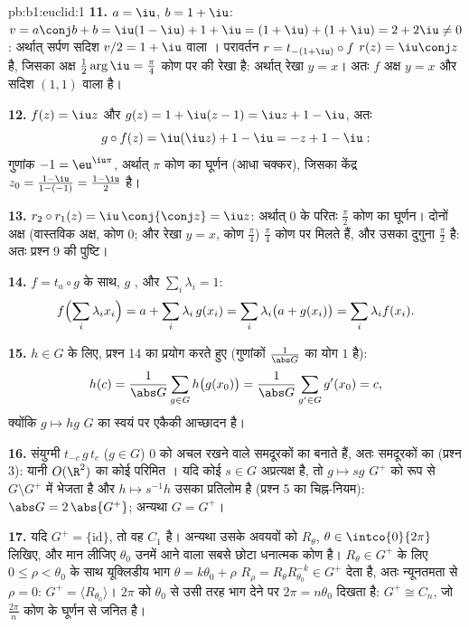 \begin{solution}{pb:b1:euclid:1}
\textbf{11.} $a = \iu$, $b = 1 + \iu$: $v = a\conj b + b = \iu(1 - \iu) + 1
+ \iu = (1 + \iu) + (1 + \iu) = 2 + 2\iu \neq 0$: अर्थात् सर्पण सदिश $v/2 =
1 + \iu$ वाला । परावर्तन $r = t_{-(1+\iu)}\circ f$ $r(z) =
\iu\conj z$ है, जिसका अक्ष $\frac12\arg\iu = \frac\pi4$ कोण पर की रेखा है:
अर्थात् रेखा $y = x$। अतः $f$ अक्ष $y = x$ और सदिश $(1, 1)$ वाला  है।

\textbf{12.} $f(z) = \iu z$ और $g(z) = 1 + \iu(z - 1) = \iu z + 1 - \iu$,
अतः
\[
g\circ f(z) = \iu(\iu z) + 1 - \iu = -z + 1 - \iu :
\]
 गुणांक $-1 = \eu^{\iu\pi}$, अर्थात् $\pi$ कोण का घूर्णन (आधा चक्कर),
जिसका केंद्र $z_0 = \frac{1 - \iu}{1 - (-1)} = \frac{1 - \iu}{2}$ है।

\textbf{13.} $r_2\circ r_1(z) = \iu\,\conj{\conj z} = \iu z$: अर्थात् $0$ के
परितः $\frac\pi2$ कोण का घूर्णन। दोनों अक्ष (वास्तविक अक्ष, कोण $0$; और रेखा
$y = x$, कोण $\frac\pi4$) $\frac\pi4$ कोण पर मिलते हैं, और उसका दुगुना
$\frac\pi2$ है: अतः प्रश्न 9 की पुष्टि।

\textbf{14.} $f = t_a\circ g$ के साथ, $g$ , और $\sum_i \lambda_i = 1$:
\[
f\Bigl(\sum_i \lambda_i x_i\Bigr)
= a + \sum_i \lambda_i\,g(x_i)
= \sum_i \lambda_i\bigl(a + g(x_i)\bigr)
= \sum_i \lambda_i f(x_i) .
\]

\textbf{15.} $h \in G$ के लिए, प्रश्न 14 का प्रयोग करते हुए (गुणांकों
$\frac1{\abs G}$ का योग $1$ है):
\[
h(c) = \frac{1}{\abs G}\sum_{g \in G} h\bigl(g(x_0)\bigr)
= \frac{1}{\abs G}\sum_{g' \in G} g'(x_0) = c ,
\]
क्योंकि $g \mapsto hg$ $G$ का स्वयं पर एकैकी आच्छादन है।

\textbf{16.} संयुग्मी $t_{-c}\,g\,t_{c}$ ($g \in G$) $0$ को अचल रखने वाले
समदूरकों का  बनाते हैं, अतः \emph{} समदूरकों का (प्रश्न 3): यानी
$O(\R^2)$ का कोई परिमित । यदि कोई $s \in G$ अप्रत्यक्ष है, तो
 $g \mapsto sg$ $G^+$ को  रूप से $G\setminus G^+$ में भेजता
है और $h \mapsto s^{-1}h$ उसका प्रतिलोम है (प्रश्न 5 का चिह्न-नियम): $\abs G
= 2\,\abs{G^+}$; अन्यथा $G = G^+$।

\textbf{17.} यदि $G^{+} = \{\mathrm{id}\}$, तो वह $C_1$ है। अन्यथा उसके
अवयवों को $R_\theta$, $\theta \in \intco{0}{2\pi}$ लिखिए, और मान लीजिए
$\theta_0$ उनमें आने वाला सबसे छोटा धनात्मक कोण है। $R_\theta \in G^{+}$ के
लिए $0 \leq \rho < \theta_0$ के साथ यूक्लिडीय भाग $\theta = k\theta_0 +
\rho$ $R_\rho = R_\theta R_{\theta_0}^{-k} \in G^{+}$ देता है, अतः न्यूनतमता
से $\rho = 0$: $G^{+} = \langle R_{\theta_0}\rangle$। $2\pi$ को $\theta_0$
से उसी तरह भाग देने पर $2\pi = n\theta_0$ दिखता है: $G^{+} \cong C_n$, जो
$\frac{2\pi}n$ कोण के घूर्णन से जनित है।


\end{solution}
